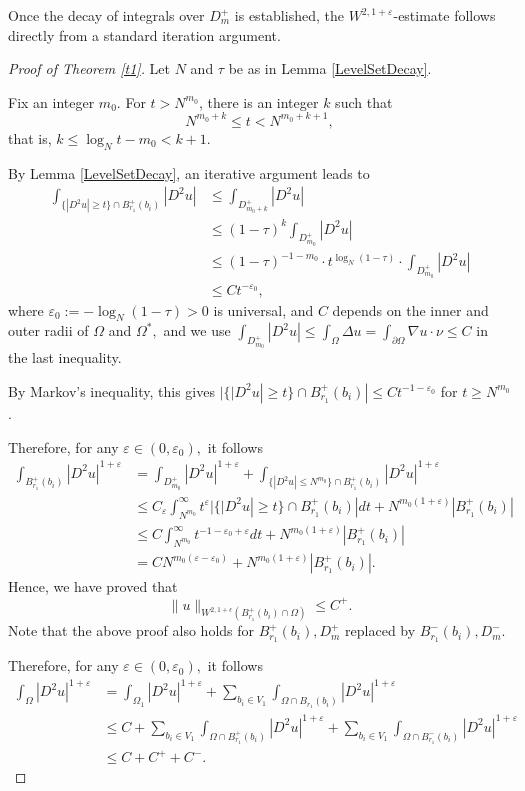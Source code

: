 \documentclass[11pt]{amsart}
\theoremstyle{plain}
\newcommand{\eps}{\varepsilon}
\newcommand{\0}{\textbf{0}}
\numberwithin{equation}{section}
\numberwithin{equation}{section}
\numberwithin{figure}{section}
\begin{document}
Once the decay of integrals over $D^+_m$ is established, the $W^{2,1+\eps}$-estimate follows directly from a standard iteration argument.
\begin{proof}[Proof of Theorem \ref{t1}]
	Let $N$ and $\tau$ be as in Lemma \ref{LevelSetDecay}. 
	
	Fix an integer $m_0.$ For $t>N^{m_0}$, there is an integer $k$ such that $$N^{m_0+k}\le t< N^{m_0+k+1},$$ that is, $k\le \log_N t-m_0<k+1.$
	
	By Lemma \ref{LevelSetDecay}, an iterative argument leads to 
	\begin{align*}\int_{\{|D^2u|\ge t\}\cap B^{+}_{r_1}(b_i)}|D^2u|&\le  \int_{D^+_{m_0+k}}|D^2u|\\&\le (1-\tau)^{k}\int_{D^+_{m_0}}|D^2u|\\&\le (1-\tau)^{-1-m_0}\cdot t^{\log_N(1-\tau)}\cdot\int_{D^+_{m_0}}|D^2u|\\&\leq Ct^{-\eps_0},
	\end{align*}
	where $\eps_0:=-\log_N(1-\tau)>0$ is universal, and $C$ depends on the inner and outer radii of $\Omega$ and $\Omega^*,$ and we use $\int_{D^+_{m_0}}|D^2u|\le\int_{ \Omega}\Delta u=\int_{\partial\Omega}\nabla u\cdot \nu\le C$ in the last inequality. 
	
	By Markov's inequality, this gives $|\{|D^2u|\ge t\}\cap B^{+}_{r_1}(b_i)|\le Ct^{-1-\eps_0}$ for $t\ge N^{m_0}$.
	
	Therefore, for any $\eps\in(0,\eps_0),$ it follows 
	\begin{align*}
		\int_{B^{+}_{r_1}(b_i)} |D^2u|^{1+\eps}&=\int_{D^+_{m_0}}|D^2u|^{1+\eps}+\int_{\{|D^2u|\le N^{m_0}\}\cap B^{+}_{r_1}(b_i)}|D^2u|^{1+\eps}\\&\le C_\eps\int_{N^{m_0}}^\infty t^{\eps}|\{|D^2u|\ge t\}\cap B^{+}_{r_1}(b_i)|dt+N^{m_0(1+\eps)}| B^{+}_{r_1}(b_i)|\\&\le C\int_{N^{m_0}}^\infty t^{-1-\eps_0+\eps}dt+N^{m_0(1+\eps)}| B^{+}_{r_1}(b_i)|\\&=CN^{m_0(\eps-\eps_0)}+N^{m_0(1+\eps)}| B^{+}_{r_1}(b_i)|.
	\end{align*}
	Hence, we have proved that
	$$\|u\|_{W^{2,1+\epsilon}(B^+_{r_1}(b_i)\cap \Omega)}\leq C^+.$$
	Note that the above proof also holds for $B^{+}_{r_1}(b_i), D^+_m$ replaced by $B^{-}_{r_1}(b_i), D^-_m.$
	
	Therefore, for any $\eps\in(0,\eps_0),$ it follows 
	\begin{align*}
		\int_{\Omega} |D^2u|^{1+\eps}&=\int_{\Omega_1}|D^2u|^{1+\eps}+\sum_{b_i\in V_1}\int_{\Omega\cap B_{r_1}(b_i)}|D^2u|^{1+\eps}\\&\le C + \sum_{b_i\in V_1}\int_{\Omega\cap B^{+}_{r_1}(b_i)}|D^2u|^{1+\eps} + \sum_{b_i\in V_1}\int_{\Omega\cap B^{-}_{r_1}(b_i)}|D^2u|^{1+\eps}\\&\le C + C^+ +C^-.
	\end{align*}
\end{proof} 	
\end{document}
